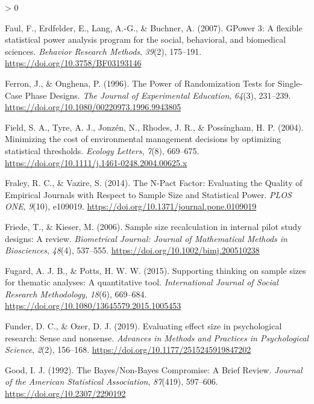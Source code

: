 \documentclass[
  english,
  ,jou, a4paper,floatsintext]{apa6}
\newlength{\cslhangindent}
\newenvironment{CSLReferences}[2] %
 {%
  \setlength{\parindent}{0pt}
  \ifodd #1 \everypar{\setlength{\hangindent}{\cslhangindent}}\ignorespaces\fi
  \ifnum #2 > 0
  \setlength{\parskip}{#2\baselineskip}
  \fi
 }%
 {}
\begin{document}
\begin{CSLReferences}{1}{0}
\leavevmode\hypertarget{ref-faul_gpower_2007}{}%
Faul, F., Erdfelder, E., Lang, A.-G., \& Buchner, A. (2007). {GPower} 3: A flexible statistical power analysis program for the social, behavioral, and biomedical sciences. \emph{Behavior Research Methods}, \emph{39}(2), 175--191. \url{https://doi.org/10.3758/BF03193146}

\leavevmode\hypertarget{ref-ferron_power_1996}{}%
Ferron, J., \& Onghena, P. (1996). The {Power} of {Randomization Tests} for {Single}-{Case Phase Designs}. \emph{The Journal of Experimental Education}, \emph{64}(3), 231--239. \url{https://doi.org/10.1080/00220973.1996.9943805}

\leavevmode\hypertarget{ref-field_minimizing_2004}{}%
Field, S. A., Tyre, A. J., Jonzén, N., Rhodes, J. R., \& Possingham, H. P. (2004). Minimizing the cost of environmental management decisions by optimizing statistical thresholds. \emph{Ecology Letters}, \emph{7}(8), 669--675. \url{https://doi.org/10.1111/j.1461-0248.2004.00625.x}

\leavevmode\hypertarget{ref-fraley_n-pact_2014}{}%
Fraley, R. C., \& Vazire, S. (2014). The {N}-{Pact Factor}: Evaluating the {Quality} of {Empirical Journals} with {Respect} to {Sample Size} and {Statistical Power}. \emph{PLOS ONE}, \emph{9}(10), e109019. \url{https://doi.org/10.1371/journal.pone.0109019}

\leavevmode\hypertarget{ref-friede_sample_2006}{}%
Friede, T., \& Kieser, M. (2006). Sample size recalculation in internal pilot study designs: A review. \emph{Biometrical Journal: Journal of Mathematical Methods in Biosciences}, \emph{48}(4), 537--555. \url{https://doi.org/10.1002/bimj.200510238}

\leavevmode\hypertarget{ref-fugard_supporting_2015}{}%
Fugard, A. J. B., \& Potts, H. W. W. (2015). Supporting thinking on sample sizes for thematic analyses: A quantitative tool. \emph{International Journal of Social Research Methodology}, \emph{18}(6), 669--684. \url{https://doi.org/10.1080/13645579.2015.1005453}

\leavevmode\hypertarget{ref-funder_evaluating_2019}{}%
Funder, D. C., \& Ozer, D. J. (2019). Evaluating effect size in psychological research: Sense and nonsense. \emph{Advances in Methods and Practices in Psychological Science}, \emph{2}(2), 156--168. \url{https://doi.org/10.1177/2515245919847202}

\leavevmode\hypertarget{ref-good_bayesnon-bayes_1992}{}%
Good, I. J. (1992). The {Bayes}/{Non}-{Bayes Compromise}: A {Brief Review}. \emph{Journal of the American Statistical Association}, \emph{87}(419), 597--606. \url{https://doi.org/10.2307/2290192}


\end{CSLReferences}
\end{document}
